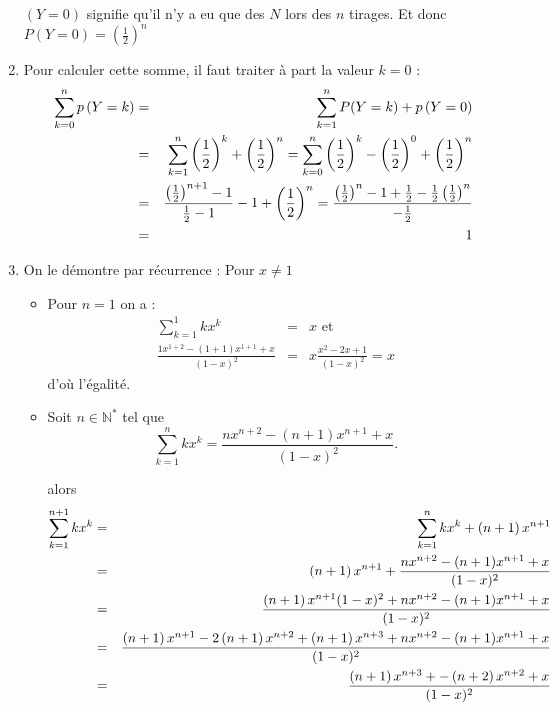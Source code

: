 \documentclass[a4paper, 11pt,reqno]{article}
\begin{document}
\begin{correction}
\begin{enumerate}
$\left( Y=0\right) $ signifie qu'il n'y a eu que des $N$ lors des $n$
tirages. Et donc $\displaystyle P(Y=0)=\left( \frac{1}{2}\right) ^{n}$

\item Pour calculer cette somme, il faut traiter \`{a} part la valeur $k=0$
: 
\begin{eqnarray*}
\sum_{k=0}^{n}p\left( Y=k\right) &=&\sum_{k=1}^{n}P(Y=k)+p\left( Y=0\right)
\\
&=&\sum_{k=1}^{n}\left( \frac{1}{2}\right) ^{k}+\left( \frac{1}{2}\right)
^{n}=\sum_{k=0}^{n}\left( \frac{1}{2}\right) ^{k}-\left( \frac{1}{2}\right)
^{0}+\left( \frac{1}{2}\right) ^{n} \\
&=&\frac{\left( \frac{1}{2}\right) ^{n+1}-1}{\frac{1}{2}-1}-1+\left( \frac{1%
}{2}\right) ^{n}=\frac{\left( \frac{1}{2}\right) ^{n}-1+\frac{1}{2}-\frac{1}{%
2}\left( \frac{1}{2}\right) ^{n}}{-\frac{1}{2}} \\
&=&1
\end{eqnarray*}

\item On le d\'{e}montre par r\'{e}currence : Pour $x\neq 1$

\begin{itemize}
\item Pour $n=1$ on a : 
\begin{eqnarray*}
\sum_{k=1}^{1}kx^{k} &=&x\mbox{ et } \\
\frac{1x^{1+2}-(1+1)x^{1+1}+x}{(1-x)^{2}} &=&x\frac{x^{2}-2x+1}{(1-x)^{2}}=x
\end{eqnarray*}
d'o\`{u} l'\'{e}galit\'{e}.

\item Soit $n\in \mathbb{N}^{*}$ tel que 
\begin{equation*}
\sum_{k=1}^{n}kx^{k}=\frac{nx^{n+2}-(n+1)x^{n+1}+x}{(1-x)^{2}}.
\end{equation*}

alors 
\begin{eqnarray*}
\sum_{k=1}^{n+1}kx^{k} &=&\sum_{k=1}^{n}kx^{k}+\left( n+1\right) x^{n+1} \\
&=&\left( n+1\right) x^{n+1}+\frac{nx^{n+2}-(n+1)x^{n+1}+x}{(1-x)^{2}} \\
&=&\frac{\left( n+1\right) x^{n+1}(1-x)^{2}+nx^{n+2}-(n+1)x^{n+1}+x}{%
(1-x)^{2}} \\
&=&\frac{\left( n+1\right) x^{n+1}-2\left( n+1\right) x^{n+2}+\left(
n+1\right) x^{n+3}+nx^{n+2}-(n+1)x^{n+1}+x}{(1-x)^{2}} \\
&=&\frac{\left( n+1\right) x^{n+3}+-\left( n+2\right) x^{n+2}+x}{(1-x)^{2}}
\end{eqnarray*}


\end{itemize}
\end{enumerate}
\end{correction}
\end{document}
